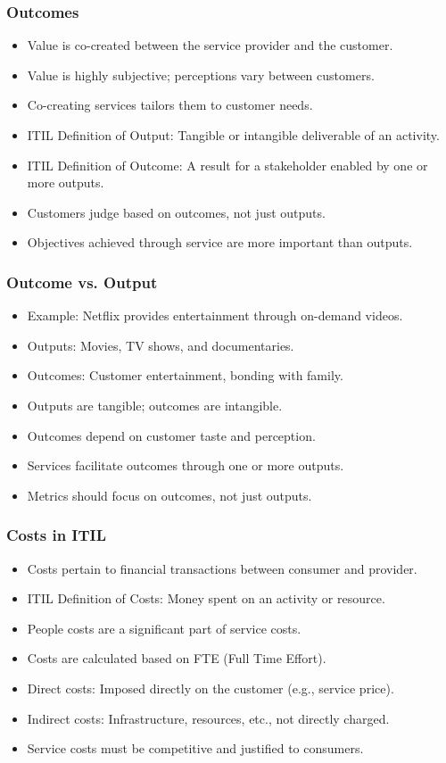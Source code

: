 \documentclass[aspectratio=169, table]{beamer}
\begin{document}
\begin{frame}
	\frametitle{Outcomes}
	\begin{itemize}
		\item Value is co-created between the service provider and the customer.
		\item Value is highly subjective; perceptions vary between customers.
		\item Co-creating services tailors them to customer needs.
		\item ITIL Definition of Output: Tangible or intangible deliverable of an activity.
		\item ITIL Definition of Outcome: A result for a stakeholder enabled by one or more outputs.
		\item Customers judge based on outcomes, not just outputs.
		\item Objectives achieved through service are more important than outputs.
	\end{itemize}
\end{frame}

\begin{frame}
	\frametitle{Outcome vs. Output}
	\begin{itemize}
		\item Example: Netflix provides entertainment through on-demand videos.
		\item Outputs: Movies, TV shows, and documentaries.
		\item Outcomes: Customer entertainment, bonding with family.
		\item Outputs are tangible; outcomes are intangible.
		\item Outcomes depend on customer taste and perception.
		\item Services facilitate outcomes through one or more outputs.
		\item Metrics should focus on outcomes, not just outputs.
	\end{itemize}
\end{frame}

\begin{frame}
	\frametitle{Costs in ITIL}
	\begin{itemize}
		\item Costs pertain to financial transactions between consumer and provider.
		\item ITIL Definition of Costs: Money spent on an activity or resource.
		\item People costs are a significant part of service costs.
		\item Costs are calculated based on FTE (Full Time Effort).
		\item Direct costs: Imposed directly on the customer (e.g., service price).
		\item Indirect costs: Infrastructure, resources, etc., not directly charged.
		\item Service costs must be competitive and justified to consumers.
	\end{itemize}
\end{frame}
\end{document}
